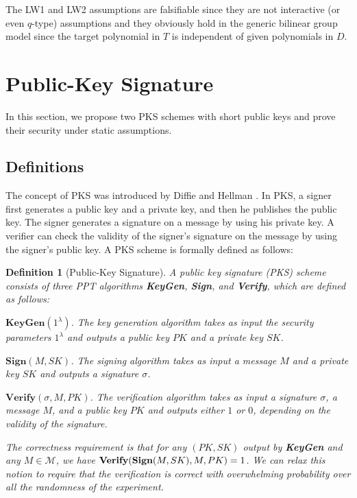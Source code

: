 \documentclass[11pt,letterpaper]{article}
\newtheorem{definition}[theorem]{Definition}
\newcommand{\tb}[1]{\textbf{#1}}
\newcommand{\lb}{\linebreak[0]}
\begin{document}
The LW1 and LW2 assumptions are falsifiable since they are not interactive
(or even $q$-type) assumptions and they obviously hold in the generic
bilinear group model since the target polynomial in $T$ is independent of
given polynomials in $D$.

\section{Public-Key Signature} \label{sec:pks}

In this section, we propose two PKS schemes with short public keys and prove
their security under static assumptions.

\subsection{Definitions}

The concept of PKS was introduced by Diffie and Hellman \cite{DiffieH76}. In
PKS, a signer first generates a public key and a private key, and then he
publishes the public key. The signer generates a signature on a message by
using his private key. A verifier can check the validity of the signer's
signature on the message by using the signer's public key. A PKS scheme is
formally defined as follows:

\begin{definition}[Public-Key Signature]
A public key signature (PKS) scheme consists of three PPT algorithms
\tb{KeyGen}, \tb{Sign}, and \tb{Verify}, which are defined as follows:
\begin{description}
\item $\tb{KeyGen}(1^{\lambda})$. The key generation algorithm takes as
    input the security parameters $1^{\lambda}$ and outputs a public key
    $PK$ and a private key $SK$.

\item $\tb{Sign}(M, SK)$. The signing algorithm takes as input a message
    $M$ and a private key $SK$ and outputs a signature $\sigma$.

\item $\tb{Verify}(\sigma, M, PK)$. The verification algorithm takes as
    input a signature $\sigma$, a message $M$, and a public key $PK$ and
    outputs either $1$ or $0$, depending on the validity of the signature.
\end{description}
The correctness requirement is that for any $(PK,SK)$ output by \tb{KeyGen}
and any $M \in \mathcal{M}$, we have $\tb{Verify} \lb (\tb{Sign} (M,SK), M,
PK) = 1$. We can relax this notion to require that the verification is
correct with overwhelming probability over all the randomness of the
experiment.
\end{definition}
\end{document}
